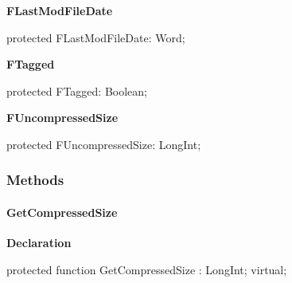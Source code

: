 \documentclass{report}
\newif\ifpdf
\begin{document}
\begin{list}{}
\begin{flushleft}
\ifpdf
\end{flushleft}
\fi


\par  \label{AbArcTyp.TAbArchiveItem-FLastModFileDate}
\item[\textbf{FLastModFileDate}\hfill]
\ifpdf
\begin{flushleft}
\fi
\begin{ttfamily}
protected FLastModFileDate: Word;\end{ttfamily}

\ifpdf
\end{flushleft}
\fi


\par  \label{AbArcTyp.TAbArchiveItem-FTagged}
\item[\textbf{FTagged}\hfill]
\ifpdf
\begin{flushleft}
\fi
\begin{ttfamily}
protected FTagged: Boolean;\end{ttfamily}

\ifpdf
\end{flushleft}
\fi


\par  \label{AbArcTyp.TAbArchiveItem-FUncompressedSize}
\item[\textbf{FUncompressedSize}\hfill]
\ifpdf
\begin{flushleft}
\fi
\begin{ttfamily}
protected FUncompressedSize: LongInt;\end{ttfamily}

\ifpdf
\end{flushleft}
\fi


\par  \end{list}
\subsubsection*{\large{\textbf{Methods}}\normalsize\hspace{1ex}\hfill}
\paragraph*{GetCompressedSize}\hspace*{\fill}

\label{AbArcTyp.TAbArchiveItem-GetCompressedSize}
\begin{list}{}{
\setlength{\itemindent}{0cm}
\setlength{\listparindent}{0cm}
\setlength{\leftmargin}{\evensidemargin}
\addtolength{\leftmargin}{\tmplength}
\settowidth{\labelsep}{X}
\addtolength{\leftmargin}{\labelsep}
\setlength{\labelwidth}{\tmplength}
}
\item[\textbf{Declaration}\hfill]
\ifpdf
\begin{flushleft}
\fi
\begin{ttfamily}
protected function GetCompressedSize : LongInt; virtual;\end{ttfamily}

\ifpdf
\end{flushleft}
\fi

\end{list}
\end{document}
